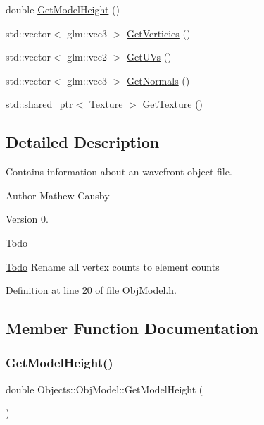 \begin{DoxyCompactItemize}
double \hyperlink{class_objects_1_1_obj_model_a860648f8d6fb7ef982e55541a95e2439}{Get\+Model\+Height} ()
\item 
std\+::vector$<$ glm\+::vec3 $>$ \hyperlink{class_objects_1_1_obj_model_a6d17114bb249c782890410c47b568a61}{Get\+Verticies} ()
\item 
std\+::vector$<$ glm\+::vec2 $>$ \hyperlink{class_objects_1_1_obj_model_a609d85c35d37c8495c91f43ab7047c68}{Get\+U\+Vs} ()
\item 
std\+::vector$<$ glm\+::vec3 $>$ \hyperlink{class_objects_1_1_obj_model_a850d4f9b45247cc410b9d394973895ee}{Get\+Normals} ()
\item 
std\+::shared\+\_\+ptr$<$ \hyperlink{class_objects_1_1_texture}{Texture} $>$ \hyperlink{class_objects_1_1_obj_model_a29c30b353f9089312caa7667fcdebc6c}{Get\+Texture} ()
\end{DoxyCompactItemize}


\subsection{Detailed Description}
Contains information about an wavefront object file. \begin{DoxyAuthor}{Author}
Mathew Causby 
\end{DoxyAuthor}
\begin{DoxyVersion}{Version}
0. 
\end{DoxyVersion}
\begin{DoxyRefDesc}{Todo}
\item[\hyperlink{todo__todo000004}{Todo}]Rename all vertex counts to element counts \end{DoxyRefDesc}


Definition at line 20 of file Obj\+Model.\+h.



\subsection{Member Function Documentation}
\mbox{\label{class_objects_1_1_obj_model_a860648f8d6fb7ef982e55541a95e2439}} 
\subsubsection{\texorpdfstring{Get\+Model\+Height()}{GetModelHeight()}}
{\footnotesize\ttfamily double Objects\+::\+Obj\+Model\+::\+Get\+Model\+Height (\begin{DoxyParamCaption}{ }\end{DoxyParamCaption})}

